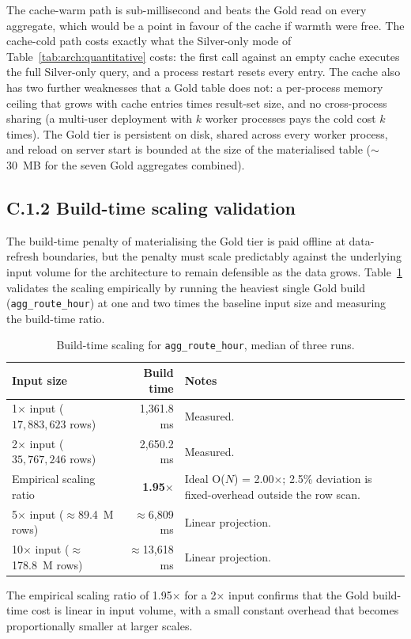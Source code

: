 The cache-warm path is sub-millisecond and beats the Gold read on
every aggregate, which would be a point in favour of the cache if
warmth were free. The cache-cold path costs exactly what the
Silver-only mode of Table~\ref{tab:arch:quantitative} costs: the
first call against an empty cache executes the full Silver-only
query, and a process restart resets every entry. The cache also has
two further weaknesses that a Gold table does not: a per-process
memory ceiling that grows with cache entries times result-set size,
and no cross-process sharing (a multi-user deployment with $k$
worker processes pays the cold cost $k$ times). The Gold tier is
persistent on disk, shared across every worker process, and reload
on server start is bounded at the size of the materialised table
($\sim$30~MB for the seven Gold aggregates combined).

\subsection*{C.1.2 Build-time scaling validation}
\label{sec:solution:architecture:scaling}

The build-time penalty of materialising the Gold tier is paid offline
at data-refresh boundaries, but the penalty must scale predictably
against the underlying input volume for the architecture to remain
defensible as the data grows. Table~\ref{tab:arch:scaling} validates
the scaling empirically by running the heaviest single Gold build
(\texttt{agg\_route\_hour}) at one and two times the baseline input
size and measuring the build-time ratio.

\begin{table}[!htbp]
\centering
\caption{Build-time scaling for \texttt{agg\_route\_hour}, median of three runs.}
\label{tab:arch:scaling}
\footnotesize
\renewcommand{\arraystretch}{1.20}
\begin{tabularx}{\linewidth}{p{5.8cm} r X}
\hline
\textbf{Input size} & \textbf{Build time} & \textbf{Notes} \\
\hline
1$\times$ input ($17{,}883{,}623$ rows) & 1{,}361.8 ms & Measured. \\
2$\times$ input ($35{,}767{,}246$ rows) & 2{,}650.2 ms & Measured. \\
Empirical scaling ratio                 & \textbf{1.95$\times$} & Ideal O($N$) = 2.00$\times$; 2.5\% deviation is fixed-overhead outside the row scan. \\
5$\times$ input ($\approx$89.4~M rows)  & $\approx$6{,}809 ms & Linear projection. \\
10$\times$ input ($\approx$178.8~M rows) & $\approx$13{,}618 ms & Linear projection. \\
\hline
\end{tabularx}
\end{table}

The empirical scaling ratio of 1.95$\times$ for a 2$\times$ input
confirms that the Gold build-time cost is linear in input volume,
with a small constant overhead that becomes proportionally smaller
at larger scales.
